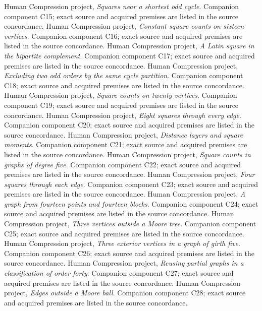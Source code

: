  Human Compression project, \emph{Squares near a shortest odd cycle}. Companion component C15; exact source and acquired premises are listed in the source concordance.
 Human Compression project, \emph{Constant square counts on sixteen vertices}. Companion component C16; exact source and acquired premises are listed in the source concordance.
 Human Compression project, \emph{A Latin square in the bipartite complement}. Companion component C17; exact source and acquired premises are listed in the source concordance.
 Human Compression project, \emph{Excluding two odd orders by the same cycle partition}. Companion component C18; exact source and acquired premises are listed in the source concordance.
 Human Compression project, \emph{Square counts on twenty vertices}. Companion component C19; exact source and acquired premises are listed in the source concordance.
 Human Compression project, \emph{Eight squares through every edge}. Companion component C20; exact source and acquired premises are listed in the source concordance.
 Human Compression project, \emph{Distance layers and square moments}. Companion component C21; exact source and acquired premises are listed in the source concordance.
 Human Compression project, \emph{Square counts in graphs of degree five}. Companion component C22; exact source and acquired premises are listed in the source concordance.
 Human Compression project, \emph{Four squares through each edge}. Companion component C23; exact source and acquired premises are listed in the source concordance.
 Human Compression project, \emph{A graph from fourteen points and fourteen blocks}. Companion component C24; exact source and acquired premises are listed in the source concordance.
 Human Compression project, \emph{Three vertices outside a Moore tree}. Companion component C25; exact source and acquired premises are listed in the source concordance.
 Human Compression project, \emph{Three exterior vertices in a graph of girth five}. Companion component C26; exact source and acquired premises are listed in the source concordance.
 Human Compression project, \emph{Reusing partial graphs in a classification of order forty}. Companion component C27; exact source and acquired premises are listed in the source concordance.
 Human Compression project, \emph{Edges outside a Moore ball}. Companion component C28; exact source and acquired premises are listed in the source concordance.
